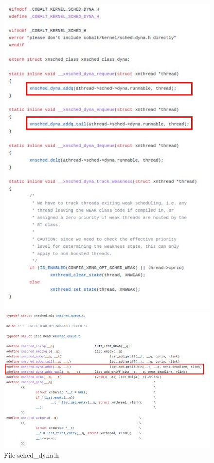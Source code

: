 \documentclass[12pt,hidelinks]{article}
\begin{document}
{        \begin{figure}
        \centering
        \begin{minipage}{0.45\textwidth}
            \centering
            \includegraphics[width=1\textwidth]{sched_dyna.png} %
            \caption{File sched\_dyna.h}
        \end{minipage}\hfill
        \begin{minipage}{0.45\textwidth}
            \centering
            \includegraphics[width=1\textwidth]{schedparam.png} %

\end{minipage}
\end{figure}}
\end{document}
